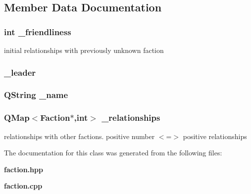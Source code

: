 \subsection{Member Data Documentation}
\subsubsection{\setlength{\rightskip}{0pt plus 5cm}int {\bf \_\-friendliness}\hspace{0.3cm}{\tt  [protected]}}\label{classFaction_p1}


initial relationships with previously unknown faction 

\subsubsection{ {\bf \_\-leader}\hspace{0.3cm}{\tt  [protected]}}\label{classFaction_p3}


\subsubsection{\setlength{\rightskip}{0pt plus 5cm}QString {\bf \_\-name}\hspace{0.3cm}{\tt  [protected]}}\label{classFaction_p0}


\subsubsection{\setlength{\rightskip}{0pt plus 5cm}QMap$<${\bf Faction}$\ast$,int$>$ {\bf \_\-relationships}\hspace{0.3cm}{\tt  [protected]}}\label{classFaction_p2}


relationships with other factions. positive number $<$=$>$ positive relationships 



The documentation for this class was generated from the following files:\begin{CompactItemize}
\item 
{\bf faction.hpp}\item 
{\bf faction.cpp}\end{CompactItemize}
